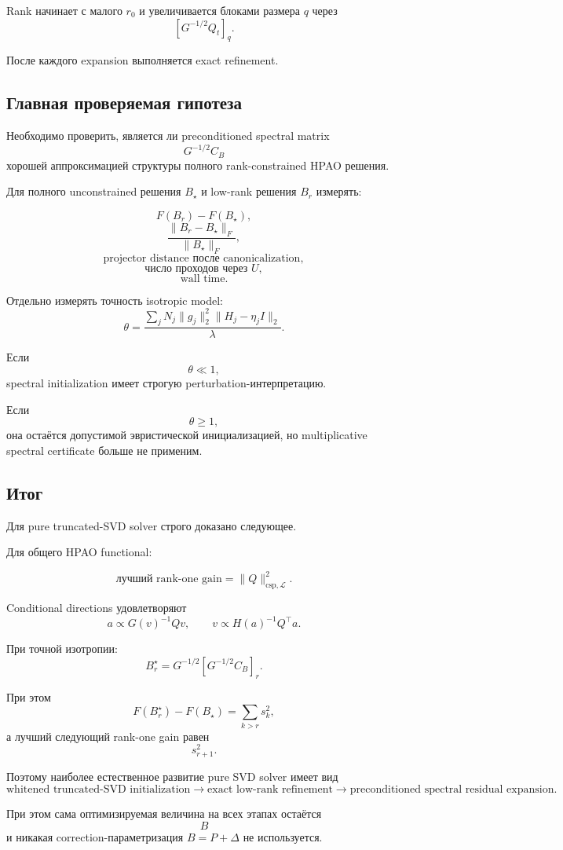 Rank начинает с малого $r_0$ и увеличивается блоками размера $q$
через
\[
    [G^{-1/2}Q_t]_q.
\]

После каждого expansion выполняется exact refinement.

\subsection{Главная проверяемая гипотеза}

Необходимо проверить, является ли preconditioned spectral matrix
\[
\boxed{
    G^{-1/2}C_B
}
\]
хорошей аппроксимацией структуры полного rank-constrained HPAO
решения.

Для полного unconstrained решения $B_\star$ и low-rank решения $B_r$
измерять:

\[
    F(B_r)-F(B_\star),
\]
\[
    \frac{\|B_r-B_\star\|_F}{\|B_\star\|_F},
\]
\[
    \text{projector distance после canonicalization},
\]
\[
    \text{число проходов через }U,
\]
\[
    \text{wall time}.
\]

Отдельно измерять точность isotropic model:
\[
\boxed{
    \theta
    =
    \frac{
        \sum_j
        N_j
        \|g_j\|_2^2
        \|H_j-\eta_jI\|_2
    }{
        \lambda
    }.
}
\]

Если
\[
    \theta\ll1,
\]
spectral initialization имеет строгую perturbation-интерпретацию.

Если
\[
    \theta\ge1,
\]
она остаётся допустимой эвристической инициализацией,
но multiplicative spectral certificate больше не применим.

\subsection{Итог}

Для pure truncated-SVD solver строго доказано следующее.

Для общего HPAO functional:

\[
\boxed{
    \text{лучший rank-one gain}
    =
    \|Q\|_{\mathrm{csp},\mathcal L}^2.
}
\]

Conditional directions удовлетворяют
\[
\boxed{
    a
    \propto
    G(v)^{-1}Qv,
    \qquad
    v
    \propto
    H(a)^{-1}Q^\top a.
}
\]

При точной изотропии:
\[
\boxed{
    B_r^\star
    =
    G^{-1/2}
    [G^{-1/2}C_B]_r.
}
\]

При этом
\[
\boxed{
    F(B_r^\star)-F(B_\star)
    =
    \sum_{k>r}s_k^2,
}
\]
а лучший следующий rank-one gain равен
\[
\boxed{
    s_{r+1}^2.
}
\]

Поэтому наиболее естественное развитие pure SVD solver имеет вид
\[
\boxed{
\text{whitened truncated-SVD initialization}
\rightarrow
\text{exact low-rank refinement}
\rightarrow
\text{preconditioned spectral residual expansion}.
}
\]

При этом сама оптимизируемая величина на всех этапах остаётся
\[
\boxed{B}
\]
и никакая correction-параметризация
$B=P+\Delta$ не используется.
